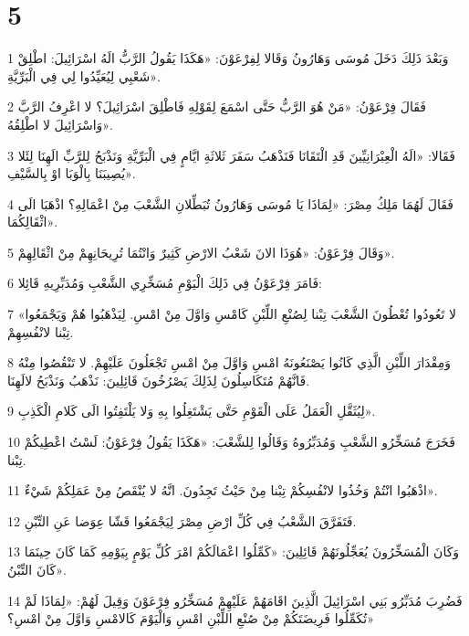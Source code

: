 \chapter{5}

\par 1 وَبَعْدَ ذَلِكَ دَخَلَ مُوسَى وَهَارُونُ وَقَالا لِفِرْعَوْنَ: «هَكَذَا يَقُولُ الرَّبُّ الَهُ اسْرَائِيلَ: اطْلِقْ شَعْبِي لِيُعَيِّدُوا لِي فِي الْبَرِّيَّةِ».
\par 2 فَقَالَ فِرْعَوْنُ: «مَنْ هُوَ الرَّبُّ حَتَّى اسْمَعَ لِقَوْلِهِ فَاطْلِقَ اسْرَائِيلَ؟ لا اعْرِفُ الرَّبَّ وَاسْرَائِيلَ لا اطْلِقُهُ».
\par 3 فَقَالا: «الَهُ الْعِبْرَانِيِّينَ قَدِ الْتَقَانَا فَنَذْهَبُ سَفَرَ ثَلاثَةِ ايَّامٍ فِي الْبَرِّيَّةِ وَنَذْبَحُ لِلرَّبِّ الَهِنَا لِئَلا يُصِيبَنَا بِالْوَبَا اوْ بِالسَّيْفِ».
\par 4 فَقَالَ لَهُمَا مَلِكُ مِصْرَ: «لِمَاذَا يَا مُوسَى وَهَارُونُ تُبَطِّلانِ الشَّعْبَ مِنْ اعْمَالِهِ؟ اذْهَبَا الَى اثْقَالِكُمَا».
\par 5 وَقَالَ فِرْعَوْنُ: «هُوَذَا الانَ شَعْبُ الارْضِ كَثِيرٌ وَانْتُمَا تُرِيحَانِهِمْ مِنْ اثْقَالِهِمْ».
\par 6 فَامَرَ فِرْعَوْنُ فِي ذَلِكَ الْيَوْمِ مُسَخِّرِي الشَّعْبِ وَمُدَبِّرِيهِ قَائِلا:
\par 7 «لا تَعُودُوا تُعْطُونَ الشَّعْبَ تِبْنا لِصُنْعِ اللِّبْنِ كَامْسِ وَاوَّلَ مِنْ امْسِ. لِيَذْهَبُوا هُمْ وَيَجْمَعُوا تِبْنا لانْفُسِهِمْ.
\par 8 وَمِقْدَارَ اللِّبْنِ الَّذِي كَانُوا يَصْنَعُونَهُ امْسِ وَاوَّلَ مِنْ امْسِ تَجْعَلُونَ عَلَيْهِمْ. لا تَنْقُصُوا مِنْهُ فَانَّهُمْ مُتَكَاسِلُونَ لِذَلِكَ يَصْرُخُونَ قَائِلِينَ: نَذْهَبُ وَنَذْبَحُ لالَهِنَا.
\par 9 لِيُثَقَّلِ الْعَمَلُ عَلَى الْقَوْمِ حَتَّى يَشْتَغِلُوا بِهِ وَلا يَلْتَفِتُوا الَى كَلامِ الْكَذِبِ».
\par 10 فَخَرَجَ مُسَخِّرُو الشَّعْبِ وَمُدَبِّرُوهُ وَقَالُوا لِلشَّعْبَ: «هَكَذَا يَقُولُ فِرْعَوْنُ: لَسْتُ اعْطِيكُمْ تِبْنا.
\par 11 اذْهَبُوا انْتُمْ وَخُذُوا لانْفُسِكُمْ تِبْنا مِنْ حَيْثُ تَجِدُونَ. انَّهُ لا يُنْقَصُ مِنْ عَمَلِكُمْ شَيْءٌ».
\par 12 فَتَفَرَّقَ الشَّعْبُ فِي كُلِّ ارْضِ مِصْرَ لِيَجْمَعُوا قَشّا عِوَضا عَنِ التِّبْنِ.
\par 13 وَكَانَ الْمُسَخِّرُونَ يُعَجِّلُونَهُمْ قَائِلِينَ: «كَمِّلُوا اعْمَالَكُمْ امْرَ كُلِّ يَوْمٍ بِيَوْمِهِ كَمَا كَانَ حِينَمَا كَانَ التِّبْنُ».
\par 14 فَضُرِبَ مُدَبِّرُو بَنِي اسْرَائِيلَ الَّذِينَ اقَامَهُمْ عَلَيْهِمْ مُسَخِّرُو فِرْعَوْنَ وَقِيلَ لَهُمْ: «لِمَاذَا لَمْ تُكَمِّلُوا فَرِيضَتَكُمْ مِنْ صُنْعِ اللِّبْنِ امْسِ وَالْيَوْمَ كَالامْسِ وَاوَّلَ مِنْ امْسِ؟»
